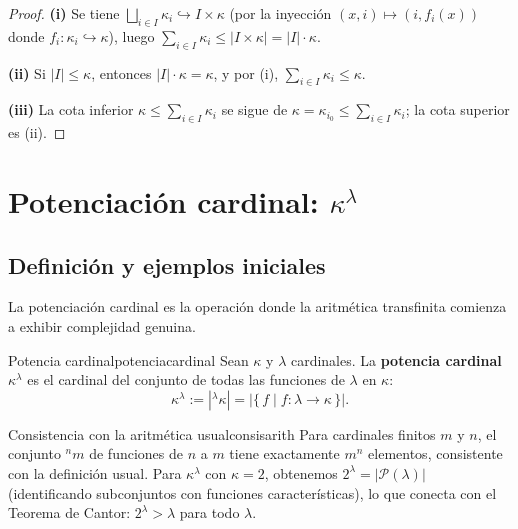 \begin{proof}
\textbf{(i)} Se tiene $\bigsqcup_{i \in I} \kappa_i \hookrightarrow I \times \kappa$ (por la inyección $(x, i) \mapsto (i, f_i(x))$ donde $f_i \colon \kappa_i \hookrightarrow \kappa$), luego $\sum_{i \in I} \kappa_i \leq |I \times \kappa| = |I| \cdot \kappa$.

\textbf{(ii)} Si $|I| \leq \kappa$, entonces $|I| \cdot \kappa = \kappa$, y por (i), $\sum_{i \in I} \kappa_i \leq \kappa$.

\textbf{(iii)} La cota inferior $\kappa \leq \sum_{i \in I} \kappa_i$ se sigue de $\kappa = \kappa_{i_0} \leq \sum_{i \in I}\kappa_i$; la cota superior es (ii).
\end{proof}

\section{Potenciación cardinal: \texorpdfstring{$\kappa^\lambda$}{κ\^{}λ}}

\subsection{Definición y ejemplos iniciales}

La potenciación cardinal es la operación donde la aritmética transfinita comienza a exhibir complejidad genuina.

\begin{definicion}{Potencia cardinal}{potenciacardinal}
Sean $\kappa$ y $\lambda$ cardinales. La \textbf{potencia cardinal} $\kappa^\lambda$ es el cardinal del conjunto de todas las funciones de $\lambda$ en $\kappa$:
\[
  \kappa^\lambda := |{}^\lambda\kappa| = |\{\,f \mid f \colon \lambda \to \kappa\,\}|.
\]
\end{definicion}

\begin{observacion}{Consistencia con la aritmética usual}{consisarith}
Para cardinales finitos $m$ y $n$, el conjunto ${}^n m$ de funciones de $n$ a $m$ tiene exactamente $m^n$ elementos, consistente con la definición usual. Para $\kappa^\lambda$ con $\kappa = 2$, obtenemos $2^\lambda = |\mathcal{P}(\lambda)|$ (identificando subconjuntos con funciones características), lo que conecta con el Teorema de Cantor: $2^\lambda > \lambda$ para todo $\lambda$.
\end{observacion}


